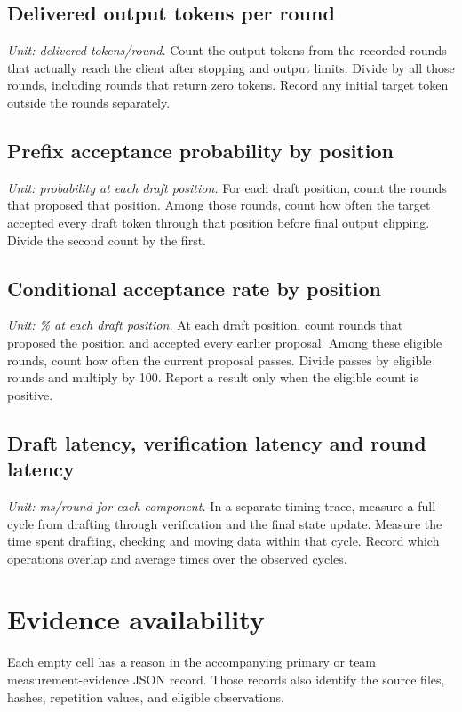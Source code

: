 \documentclass[conference,onecolumn]{IEEEtran}
\begin{document}
\subsection{Delivered output tokens per round}

\textit{Unit: delivered tokens/round.} Count the output tokens from the recorded rounds that actually reach the client after stopping and output limits. Divide by all those rounds, including rounds that return zero tokens. Record any initial target token outside the rounds separately.

\subsection{Prefix acceptance probability by position}

\textit{Unit: probability at each draft position.} For each draft position, count the rounds that proposed that position. Among those rounds, count how often the target accepted every draft token through that position before final output clipping. Divide the second count by the first.

\subsection{Conditional acceptance rate by position}

\textit{Unit: \% at each draft position.} At each draft position, count rounds that proposed the position and accepted every earlier proposal. Among these eligible rounds, count how often the current proposal passes. Divide passes by eligible rounds and multiply by 100. Report a result only when the eligible count is positive.

\subsection{Draft latency, verification latency and round latency}

\textit{Unit: ms/round for each component.} In a separate timing trace, measure a full cycle from drafting through verification and the final state update. Measure the time spent drafting, checking and moving data within that cycle. Record which operations overlap and average times over the observed cycles.
\section{Evidence availability}
Each empty cell has a reason in the accompanying primary or team measurement-evidence JSON record. Those records also identify the source files, hashes, repetition values, and eligible observations.
\end{document}
